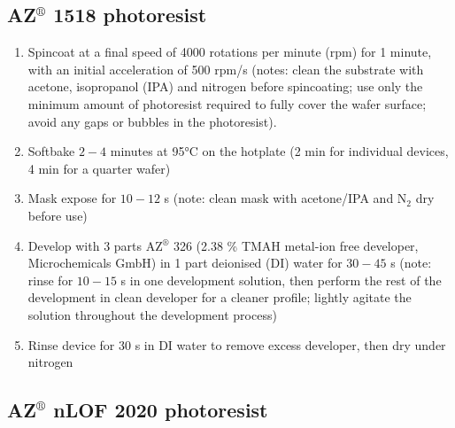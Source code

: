 \documentclass[
  a4paper,
]{scrbook}
\begin{document}
\hypertarget{azcircledr-1518-photoresist}{%
\subsection{\texorpdfstring{AZ\(^\circledR\) 1518
photoresist}{AZ\^{}\textbackslash circledR 1518 photoresist}}\label{azcircledr-1518-photoresist}}

\begin{enumerate}
\def\labelenumi{\arabic{enumi}.}
\item
  Spincoat at a final speed of 4000 rotations per minute (rpm) for 1
  minute, with an initial acceleration of 500 rpm/s (notes: clean the
  substrate with acetone, isopropanol (IPA) and nitrogen before
  spincoating; use only the minimum amount of photoresist required to
  fully cover the wafer surface; avoid any gaps or bubbles in the
  photoresist).
\item
  Softbake \(2-4\) minutes at 95°C on the hotplate (2 min for individual
  devices, 4 min for a quarter wafer)
\item
  Mask expose for \(10-12\) s (note: clean mask with acetone/IPA and
  N\(_2\) dry before use)
\item
  Develop with 3 parts AZ\(^\circledR\) 326 (2.38 \% TMAH metal-ion free
  developer, Microchemicals GmbH) in 1 part deionised (DI) water for
  \(30-45\) s (note: rinse for \(10-15\) s in one development solution,
  then perform the rest of the development in clean developer for a
  cleaner profile; lightly agitate the solution throughout the
  development process)
\item
  Rinse device for 30 s in DI water to remove excess developer, then dry
  under nitrogen
\end{enumerate}

\hypertarget{azcircledr-nlof-2020-photoresist}{%
\subsection{\texorpdfstring{AZ\(^\circledR\) nLOF 2020
photoresist}{AZ\^{}\textbackslash circledR nLOF 2020 photoresist}}\label{azcircledr-nlof-2020-photoresist}}
\end{document}
